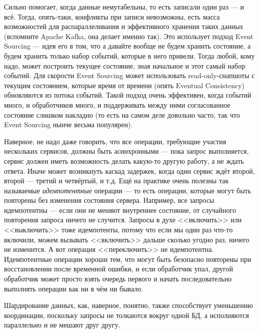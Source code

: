 \documentclass[a5paper]{article}
\begin{document}
Сильно помогает, когда данные немутабельны, то есть записали один раз --- и всё. Тогда, опять-таки, конфликты при записи невозможны, есть масса возможностей для распараллеливания и эффективного хранения таких данных (вспомните Apache Kafka, она делает именно так). Это использует подход Event Sourcing --- идея его в том, что а давайте вообще не будем хранить состояние, а будем хранить только набор событий, которые в него привели. Тогда любой, кому надо, может построить текущее состояние, зная начальное и этот самый набор событий. Для скорости Event Sourcing может использовать read-only-снапшоты с текущим состоянием, которые время от времени (опять Eventual Consistency) обновляются из потока событий. Такой подход очень эффективен, когда событий много, и обработчиков много, и поддерживать между ними согласованное состояние слишком накладно (то есть на самом деле довольно часто, так что Event Sourcing нынче весьма популярен).

Наверное, не надо даже говорить, что все операции, требующие участия нескольких сервисов, должны быть асинхронными --- пока запрос выполняется, сервис должен иметь возможность делать какую-то другую работу, а не ждать ответа. Иначе может возникнуть каскад задержек, когда один сервис ждёт второй, второй --- третий и четвёртый, и т.д. Ещё на практике очень полезны так называемые \emph{идемпотентные} операции --- то есть операции, которые могут быть повторены без изменения состояния сервера. Например, все запросы идемпотентны --- если они не меняют внутреннее состояние, от случайного повторения запроса ничего не случится. Запросы в духе <<включить>> или <<выключить>> тоже идемпотенты, потому что если мы один раз что-то включили, можем вызывать <<включить>> дальше сколько угодно раз, ничего не изменится. А вот операция <<переключить>> не идемпотентна. Идемпотентные операции хороши тем, что могут быть безопасно повторены при восстановлении после временной ошибки, и если обработчик упал, другой обработчик может просто взять очередь первого и начать последовательно выполнять операции как ни в чём ни бывало.

Шардирование данных, как, наверное, понятно, также способствует уменьшению координации, поскольку запросы не толкаются вокруг одной БД, а исполняются параллельно и не мешают друг другу.
\end{document}
